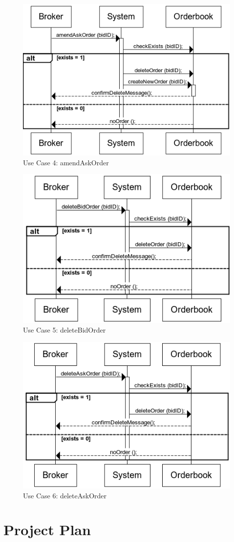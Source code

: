 \documentclass[a4paper]{article}
\begin{document}
\begin{figure}[H]
   \includegraphics[width=1\textwidth]{images/amendAskOrder}
   \caption{Use Case 4: amendAskOrder}
\end{figure}

\begin{figure}[H]
   \includegraphics[width=1\textwidth]{images/deleteBidOrder}
   \caption{Use Case 5: deleteBidOrder}
\end{figure}

\begin{figure}[H]
   \includegraphics[width=1\textwidth]{images/deleteAskOrder}
   \caption{Use Case 6: deleteAskOrder}
\end{figure}

\section {Project Plan}
\end{document}
